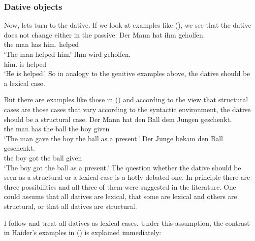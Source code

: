 \subsubsection{Dative objects}

Now, lets turn to the dative. If we look at examples like (), we see that the dative does not
change either in the passive:
\eal
\ex 
\gll Der Mann hat ihm geholfen.\\
     the\NOM{} man  has him.\DAT{} helped\\
\glt `The man helped him.'
\ex 
\gll Ihm wird geholfen.\\
     him.\DAT{} is helped\\
\glt `He is helped.'
\zl
So in analogy to the genitive examples above, the dative should be a lexical case.

But there are examples like those in () and according to the view that structural cases are
those cases that vary according to the syntactic environment, the dative should be a structural case.
\eal
\ex 
\gll Der Mann  hat   den Ball dem Jungen geschenkt.\\
     the man   has   the ball the boy given\\
\glt `The man gave the boy the ball as a present.'
\ex 
\gll Der Junge bekam den Ball geschenkt.\\
     the boy   got   the ball given\\   
\glt `The boy got the ball as a present.'
\zl
The question whether the dative should be seen as a structural or a lexical case is a hotly debated
one. In principle there are three possibilities and all three of them were suggested in the
literature. One could assume that all datives are lexical, that some are lexical and others are
structural, or that all datives are structural.

I follow \citet{Haider86} and treat all datives as lexical cases. Under this assumption, the
contrast in Haider's examples \citeyearpar[]{Haider86} in () is explained immediately:
\eal
{}

